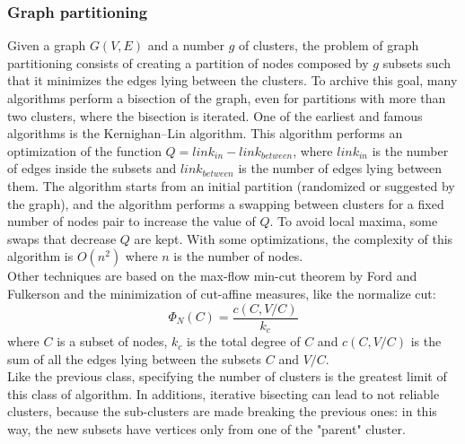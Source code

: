 \subsubsection{Graph partitioning} 
Given a graph $G(V, E)$ and a number $g$ of clusters, the problem of graph partitioning consists of creating a partition of nodes composed by $g$ subsets such that it minimizes the edges lying between the clusters. To archive this goal, many algorithms perform a bisection of the graph, even for partitions with more than two clusters, where the bisection is iterated.  One of the earliest and famous algorithms is the Kernighan–Lin algorithm. This algorithm performs an optimization of the function $Q = link_{in} - link_{between}$, where $ link_{in}$ is the number of edges inside the subsets and $link_{between}$ is the number of edges lying between them. The algorithm starts from an initial partition (randomized or suggested by the graph), and the algorithm performs a swapping between clusters for a fixed number of nodes pair to increase the value of $Q$. 
To avoid local maxima, some swaps that decrease $Q$ are kept. 
With some optimizations, the complexity of this algorithm is $O(n^2)$ where $n$ is the number of nodes.\\
Other techniques are based on the max-flow min-cut theorem by Ford and Fulkerson \cite{ford} and the minimization of cut-affine measures, like the normalize cut:
\begin{equation}
\Phi_N(C) = \frac{c(C, V/C)}{k_c}
\end{equation}
where $C$ is a subset of nodes, $k_c$ is the total degree of $C$ and $c(C, V/C)$ is the sum of all the edges lying between the subsets $C$ and $V/C$. \\
Like the previous class, specifying the number of clusters is the greatest limit of this class of algorithm. In additions, iterative bisecting can lead to not reliable clusters, because the sub-clusters are made breaking the previous ones:  in this way, the new subsets have vertices only from one of the "parent" cluster.  
